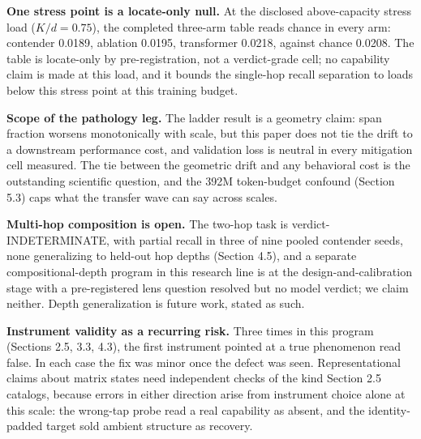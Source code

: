 \textbf{One stress point is a locate-only null.} At the disclosed
above-capacity stress load ($K/d = 0.75$), the completed three-arm
table reads chance in every arm: contender 0.0189, ablation 0.0195,
transformer 0.0218, against chance 0.0208. The
table is locate-only by pre-registration, not a verdict-grade cell; no
capability claim is made at this load, and it bounds the single-hop
recall separation to loads below this stress point at this training
budget.

\textbf{Scope of the pathology leg.} The ladder result is a geometry claim:
span fraction worsens monotonically with scale, but this paper does not
tie the drift to a downstream performance cost, and validation loss is
neutral in every mitigation cell measured. The tie between the geometric
drift and any behavioral cost is the outstanding scientific question,
and the 392M token-budget confound (Section 5.3) caps what the
transfer wave can say across scales.

\textbf{Multi-hop composition is open.} The two-hop task is
verdict-INDETERMINATE, with partial recall in three of nine pooled
contender seeds, none generalizing to held-out hop depths (Section
4.5), and a separate compositional-depth program in this research line
is at the design-and-calibration stage with a pre-registered lens
question resolved but no model verdict; we claim neither. Depth
generalization is future work, stated as such.

\textbf{Instrument validity as a recurring risk.} Three times in this
program (Sections 2.5, 3.3, 4.3), the first instrument pointed at a
true phenomenon read false. In each case the fix was minor once the
defect was seen. Representational claims about matrix
states need independent checks of the kind Section 2.5 catalogs,
because errors in either direction arise from instrument choice alone
at this scale: the wrong-tap probe read a real capability as absent,
and the identity-padded target sold ambient structure as recovery.

